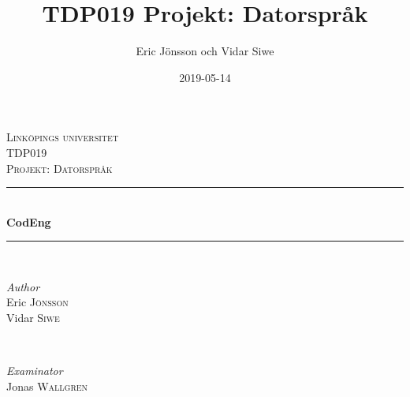 \documentclass{article}
\title{TDP019 Projekt: Datorspråk}
\author{Eric Jönsson och Vidar Siwe}
\date{2019-05-14}
\begin{document}

\begin{titlepage} %
	\newcommand{\HRule}{\rule{\linewidth}{0.5mm}} %
	
	\center %
	
	
	\textsc{\LARGE Linköpings universitet}\\[1.5cm] %
	
	\textsc{\Large TDP019}\\[0.5cm] %
	
	\textsc{\large Projekt: Datorspråk}\\[0.5cm] %
	
	
	\HRule\\[0.4cm]
	
	{\huge\bfseries CodEng}\\[0.4cm] %
	
	\HRule\\[1.5cm]
	
	
	\begin{minipage}{0.4\textwidth}
		\begin{flushleft}
			\large
			\textit{Author}\\
			Eric \textsc{Jönsson}\\
			Vidar \textsc{Siwe} %
		\end{flushleft}
	\end{minipage}
	~
	\begin{minipage}{0.4\textwidth}
		\begin{flushright}
			\large
			\textit{Examinator}\\
			Jonas \textsc{Wallgren} %
		\end{flushright}
	\end{minipage}
	

\end{titlepage}
\end{document}
